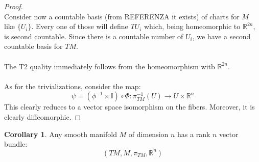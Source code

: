 \documentclass[12pt,a4paper]{report}
\theoremstyle{definition}
\theoremstyle{Theorem}
\theoremstyle{break}
\theoremstyle{definition}
\newtheorem{Cor}[Def]{Corollary}
\begin{document}
\begin{proof}
				\\
				Consider now a countable basis (from REFERENZA it exists) of charts for $M$ like $\{U_i\}$. Every one of those will define $TU_i$ which, being homeomorphic to $\mathbb{R}^{2n}$, is second countable. Since there is a countable number of $U_i$, we have a second countable basis for $TM$.\\
				\\
				The T2 quality immediately follows from the homeomorphism witb $\mathbb{R}^{2n}$.\\
				\\
				As for the trivializations, consider the map:
				$$\psi=(\phi^{-1}\times \mathbb{I})\circ \Phi:\pi_{TM}^{-1}(U)\rightarrow U\times \mathbb{R}^n$$
				This clearly reduces to a vector space isomorphism on the fibers. Moreover, it is clearly diffeomorphic. 
			\end{proof}
			\begin{Cor}
				Any smooth manifold $M$ of dimension $n$ has a rank $n$ vector bundle:
				$$(TM,M,\pi_{TM},\mathbb{R}^n)$$
			\end{Cor}
\end{document}

